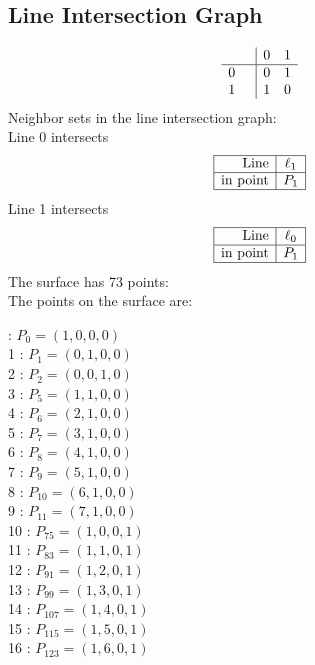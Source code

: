 \documentclass{article}
\begin{document}
{\subsection*{Line Intersection Graph}
{\arraycolsep=1pt
$$
\begin{array}{rr|*{2}r}
 &  & 0 & 1\\
\hline
0 &  & 0 & 1\\
1 &  & 1 & 0\\
\end{array}
$$
}%
Neighbor sets in the line intersection graph:\\
Line 0 intersects 
$$
\begin{array}{|r*{1}{|c}|}
\hline
\mbox{Line}  & \ell_{1}\\
\hline
\mbox{in point}  & P_{1}\\
\hline
\end{array}
$$
Line 1 intersects 
$$
\begin{array}{|r*{1}{|c}|}
\hline
\mbox{Line}  & \ell_{0}\\
\hline
\mbox{in point}  & P_{1}\\
\hline
\end{array}
$$
The surface has 73 points:\\
The points on the surface are:\\
\begin{multicols}{3}
 : $P_{0}=( 1, 0, 0, 0 )$\\
1 : $P_{1}=( 0, 1, 0, 0 )$\\
2 : $P_{2}=( 0, 0, 1, 0 )$\\
3 : $P_{5}=( 1, 1, 0, 0 )$\\
4 : $P_{6}=( 2, 1, 0, 0 )$\\
5 : $P_{7}=( 3, 1, 0, 0 )$\\
6 : $P_{8}=( 4, 1, 0, 0 )$\\
7 : $P_{9}=( 5, 1, 0, 0 )$\\
8 : $P_{10}=( 6, 1, 0, 0 )$\\
9 : $P_{11}=( 7, 1, 0, 0 )$\\
10 : $P_{75}=( 1, 0, 0, 1 )$\\
11 : $P_{83}=( 1, 1, 0, 1 )$\\
12 : $P_{91}=( 1, 2, 0, 1 )$\\
13 : $P_{99}=( 1, 3, 0, 1 )$\\
14 : $P_{107}=( 1, 4, 0, 1 )$\\
15 : $P_{115}=( 1, 5, 0, 1 )$\\
16 : $P_{123}=( 1, 6, 0, 1 )$\\

\end{multicols}}
\end{document}
